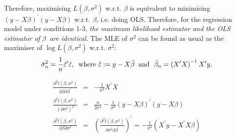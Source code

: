 \documentclass[notes=show]{beamer}
\begin{document}
\begin{frame}%



Therefore, maximising $L\left( \beta ,\sigma ^{2}\right) $ w.r.t. $\beta $
is equivalent to minimising $\left( y-X\beta \right) ^{\prime }\left(
y-X\beta \right) $ w.r.t. $\beta $, i.e. doing OLS. Therefore, for the
regression model under conditions 1-3, \textit{the maximum likelihood
estimator and the OLS estimator of }$\beta $\textit{\ are identical}. The
MLE of $\sigma ^{2}$ can be found as usual as the maximiser of $\log L\left(
\beta ,\sigma ^{2}\right) $ w.r.t. $\sigma ^{2}$:%
\begin{equation*}
\hat{\sigma}_{n}^{2}=\frac{1}{n}\hat{\varepsilon}^{\prime }\hat{\varepsilon}%
,\;\;\text{where\ }\hat{\varepsilon}:=y-X\hat{\beta}\;\;\text{and\ \ }\hat{%
\beta}_{n}=\left( X^{\prime }X\right) ^{-1}X^{\prime }y.
\end{equation*}

\end{frame}%

\begin{frame}%



\begin{eqnarray*}
\frac{\partial ^{2}l(\beta ,\sigma ^{2})}{\partial \beta \partial \beta
^{\prime }} &=&-\frac{1}{\sigma ^{2}}X^{\prime }X \\
\frac{\partial ^{2}l(\beta ,\sigma ^{2})}{\left( \partial \sigma ^{2}\right)
^{2}} &=&\frac{n}{2\sigma ^{4}}-\frac{1}{\sigma ^{6}}(y-X\beta )^{\prime
}(y-X\beta ) \\
\frac{\partial ^{2}l(\beta ,\sigma ^{2})}{\partial \beta \partial \sigma ^{2}%
} &=&\left( \frac{\partial ^{2}l(\beta ,\sigma ^{2})}{\partial \sigma
^{2}\partial \beta ^{\prime }}\right) ^{\prime }=-\frac{1}{\sigma ^{4}}%
(X^{\prime }y-X^{\prime }X\beta )
\end{eqnarray*}

\end{frame}%
\end{document}
